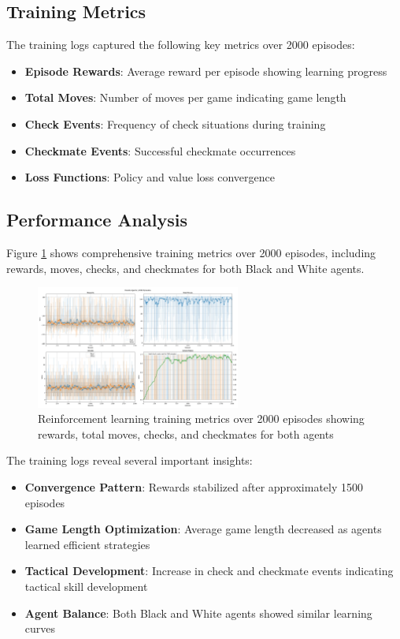 \documentclass[11pt,a4paper]{report}
\begin{document}
\subsection{Training Metrics}
The training logs captured the following key metrics over 2000 episodes:

\begin{itemize}
    \item \textbf{Episode Rewards}: Average reward per episode showing learning progress
    \item \textbf{Total Moves}: Number of moves per game indicating game length
    \item \textbf{Check Events}: Frequency of check situations during training
    \item \textbf{Checkmate Events}: Successful checkmate occurrences
    \item \textbf{Loss Functions}: Policy and value loss convergence
\end{itemize}

\subsection{Performance Analysis}
Figure \ref{fig:rl_training_curves} shows comprehensive training metrics over 2000 episodes, including rewards, moves, checks, and checkmates for both Black and White agents.

\begin{figure}[H]
    \centering
    \includegraphics[width=0.6\textwidth]{images/rl_training_plots.jpg}
    \caption{Reinforcement learning training metrics over 2000 episodes showing rewards, total moves, checks, and checkmates for both agents}
    \label{fig:rl_training_curves}
\end{figure}

The training logs reveal several important insights:

\begin{itemize}
    \item \textbf{Convergence Pattern}: Rewards stabilized after approximately 1500 episodes
    \item \textbf{Game Length Optimization}: Average game length decreased as agents learned efficient strategies
    \item \textbf{Tactical Development}: Increase in check and checkmate events indicating tactical skill development
    \item \textbf{Agent Balance}: Both Black and White agents showed similar learning curves
\end{itemize}
\end{document}

